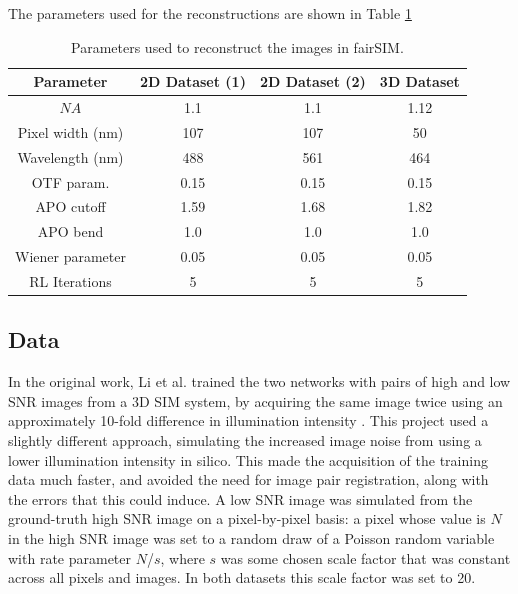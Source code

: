 \documentclass[12pt]{article}
\newcommand\NA{\mathit{NA}}
\begin{document}
The parameters used for the reconstructions are shown in Table \ref{tab:reconparams}

\begin{table}[htp]
    \centering
    \begin{tabular}{| c | c | c | c |}
        \hline
        Parameter & 2D Dataset (1) & 2D Dataset (2) & 3D Dataset \\
        \hline
        $\NA$  & 1.1 & 1.1 & 1.12 \\
        \hline
        Pixel width (nm) & 107 & 107 & 50 \\
        \hline
        Wavelength (nm) & 488 & 561 & 464 \\
        \hline
        OTF param.  & 0.15 & 0.15 & 0.15 \\
        \hline
        APO cutoff & 1.59 & 1.68 & 1.82 \\
        \hline
        APO bend  & 1.0 & 1.0 & 1.0 \\
        \hline
        Wiener parameter & 0.05 & 0.05 & 0.05 \\
        \hline
        RL Iterations & 5 & 5 & 5\\
        \hline

    \end{tabular}
    \caption{Parameters used to reconstruct the images in fairSIM.}
    \label{tab:reconparams}
\end{table}

\subsection{Data}

In the original work, Li et al. trained the two networks with pairs of high and low SNR images from a 3D SIM system,
by acquiring the same image twice using an approximately 10-fold difference in illumination intensity \cite{keypaper}.
This project used a slightly different approach,
simulating the increased image noise from using a lower illumination intensity in silico.
This made the acquisition of the training data much faster,
and avoided the need for image pair registration, along with the errors that this could induce.
A low SNR image was simulated from the ground-truth high SNR image on a pixel-by-pixel basis:
a pixel whose value is $N$ in the high SNR image was set to a random draw of a Poisson random variable with rate parameter $N$/$s$,
where $s$ was some chosen scale factor that was constant across all pixels and images.
In both datasets this scale factor was set to 20.
\end{document}
